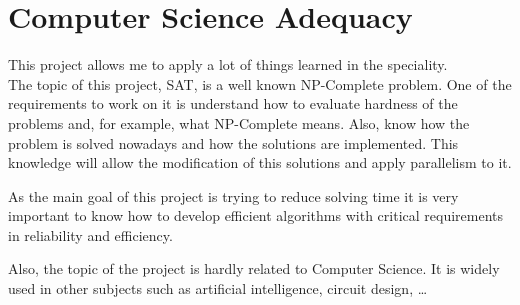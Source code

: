 \chapter{Computer Science Adequacy}

\label{Chapter4} 

This project allows me to apply a lot of things learned in the speciality.\\
The topic of this project, SAT, is a well known NP-Complete problem. One of the requirements to work on it is understand how to evaluate hardness of the problems and, for example, what NP-Complete means. Also, know how the problem is solved nowadays and how the solutions are implemented. This knowledge will allow the modification of this solutions and apply parallelism to it. 

As the main goal of this project is trying to reduce solving time it is very important to know how to develop efficient algorithms with critical requirements in reliability and efficiency. 

Also, the topic of the project is hardly related to Computer Science. It is widely used in other subjects such as artificial intelligence, circuit design, \ldots 